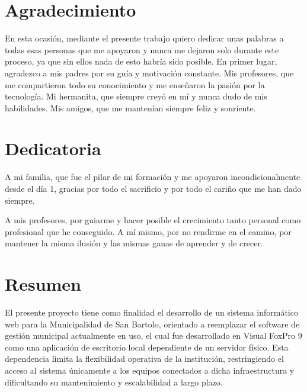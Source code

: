 \documentclass[12pt,a4paper]{report}
\begin{document}



\chapter*{Agradecimiento}

En esta ocasión, mediante el presente trabajo quiero dedicar unas palabras a todas esas personas que me apoyaron y nunca me dejaron solo durante este proceso, ya que sin ellos nada de esto habría sido posible.
En primer lugar, agradezco a mis padres por su guía y motivación constante. Mis profesores, que me compartieron todo su conocimiento y me enseñaron la pasión por la tecnología. Mi hermanita, que siempre creyó en mí y nunca dudo de mis habilidades. Mis amigos, que me mantenían siempre feliz y sonriente.



\chapter*{Dedicatoria}

A mi familia, que fue el pilar de mi formación y me apoyaron incondicionalmente desde el día 1, gracias por todo el sacrificio y por todo el cariño que me han dado siempre.

A mis profesores, por guiarme y hacer posible el crecimiento tanto personal como profesional que he conseguido.
A mí mismo, por no rendirme en el camino, por mantener la misma ilusión y las mismas ganas de aprender y de crecer.


\chapter*{Resumen}

El presente proyecto tiene como finalidad el desarrollo de un sistema informático web para la Municipalidad de San Bartolo, orientado a reemplazar el software de gestión municipal actualmente en uso, el cual fue desarrollado en Visual FoxPro 9 como una aplicación de escritorio local dependiente de un servidor físico. Esta dependencia limita la flexibilidad operativa de la institución, restringiendo el acceso al sistema únicamente a los equipos conectados a dicha infraestructura y dificultando su mantenimiento y escalabilidad a largo plazo.
\end{document}

